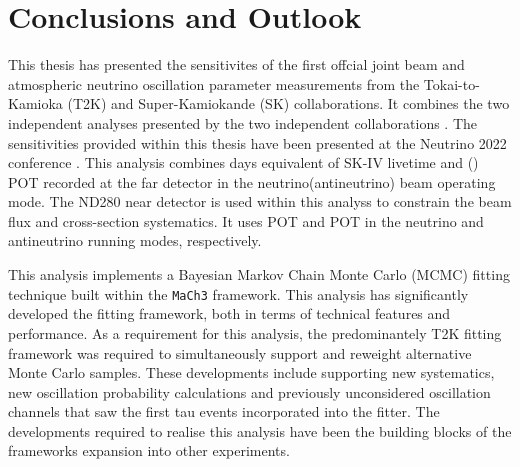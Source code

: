 \chapter{Conclusions and Outlook}

This thesis has presented the sensitivites of the first offcial joint beam and atmospheric neutrino oscillation parameter measurements from the Tokai-to-Kamioka (T2K) and Super-Kamiokande (SK) collaborations. It combines the two independent analyses presented by the two independent collaborations \cite{Dunne2020-uf,Jiang2019-iw}. The sensitivities provided within this thesis have been presented at the Neutrino 2022 conference \cite{Bronner2022-wd}. This analysis combines  days equivalent of SK-IV livetime and () POT recorded at the far detector in the neutrino(antineutrino) beam operating mode. The ND280 near detector is used within this analyss to constrain the beam flux and cross-section systematics. It uses POT and POT in the neutrino and antineutrino running modes, respectively.


This analysis implements a Bayesian Markov Chain Monte Carlo (MCMC) fitting technique built within the \texttt{MaCh3} framework. This analysis has significantly developed the fitting framework, both in terms of technical features and performance. As a requirement for this analysis, the predominantely T2K fitting framework was required to simultaneously support and reweight alternative Monte Carlo samples. These developments include supporting new systematics, new oscillation probability calculations and previously unconsidered oscillation channels that saw the first tau events incorporated into the fitter. The developments required to realise this analysis have been the building blocks of the frameworks expansion into other experiments. 

